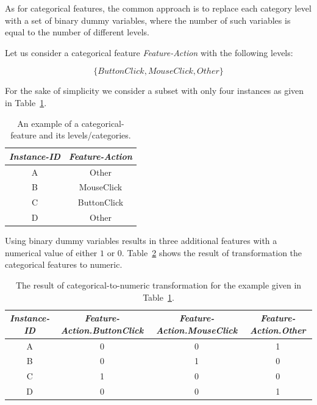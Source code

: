 As for categorical features, the common approach is to replace each category level with a set of binary dummy variables, where the number of such variables is equal to the number of different levels.

Let us consider a categorical feature \textit{Feature-Action} with the following levels: 

\[ \{ButtonClick, MouseClick, Other\} \]

For the sake of simplicity we consider a subset with only four instances as given in Table~\ref{tab:feature-categorical-rep}. 
\begin{table}[h!]
  \begin{center}
    \caption{An example of a categorical-feature and its levels/categories.}
    \label{tab:feature-categorical-rep}
    \begin{tabular}{|c|c|}\hline
    \textit{Instance-ID} & \textit{Feature-Action} \\
      \hline
     A & Other \\ 
     \hline 
       B & MouseClick \\ 
     \hline
       C & ButtonClick \\ 
     \hline
       D & Other \\ 
     \hline
    \end{tabular}
  \end{center}
\end{table}

Using binary dummy variables results in three additional features with a numerical value of either \(1\) or \(0\). Table~\ref{tab:feature-binarization} shows the result of transformation the categorical features to numeric.

\clearpage


\begin{table}
  \begin{center}
    \caption{The result of categorical-to-numeric transformation for the example given in Table~\ref{tab:feature-categorical-rep}.}
    \label{tab:feature-binarization}
    \begin{tabular}{|c|c|c|c|}\hline
    \textit{Instance-ID} & \textit{Feature-Action.ButtonClick} & \textit{Feature-Action.MouseClick} & \textit{Feature-Action.Other} \\
      \hline
     A & 0 & 0 & 1 \\ 
     \hline 
       B & 0 & 1 & 0 \\ 
     \hline
       C & 1 & 0 & 0 \\ 
     \hline
       D & 0 & 0 & 1 \\ 
     \hline
    \end{tabular}
  \end{center}
\end{table}

